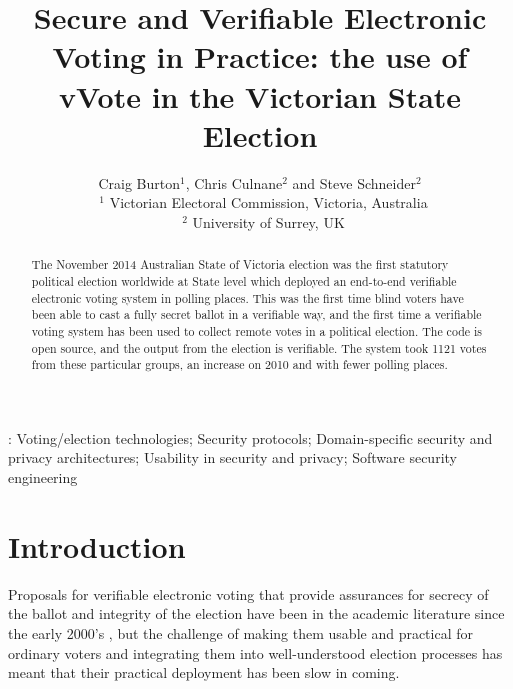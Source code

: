 \documentclass[twocolumn]{article}
\begin{document}
\title{Secure and Verifiable Electronic Voting in Practice: the use of vVote in the Victorian State Election}

\author{Craig Burton$^1$, Chris Culnane$^2$ and Steve Schneider$^2$ \\ \small \ $^1$ Victorian Electoral Commission, Victoria, Australia \\ \small \ $^2$ University of Surrey, UK}



\maketitle

: Voting/election technologies; Security protocols;
Domain-specific security and privacy architectures; Usability in security and privacy; Software security engineering

\begin{abstract}
The November 2014 Australian State of Victoria election was the first statutory political election worldwide at State level which deployed an end-to-end verifiable electronic voting system in polling places.  This was the first time blind voters have been able to cast a fully secret ballot in a verifiable way, and the first time a verifiable voting system has been used to collect remote votes in a political election.  The code is open source, and the output from the election is verifiable.  The system took 1121 votes from these particular groups, an increase on 2010 and with fewer polling places.
\end{abstract}

\section{Introduction}

Proposals for verifiable electronic voting that provide assurances for secrecy of the ballot and integrity of the election have been in the academic literature since the early 2000's \cite{neff01:e-vote,DBLP:journals/ieeesp/Chaum04,chaum05:e-vote,BenalohSimple06,VoteBox}, but the challenge of making them usable and practical for ordinary voters and integrating them into well-understood election processes has meant that their practical deployment has been slow in coming.  
\end{document}
